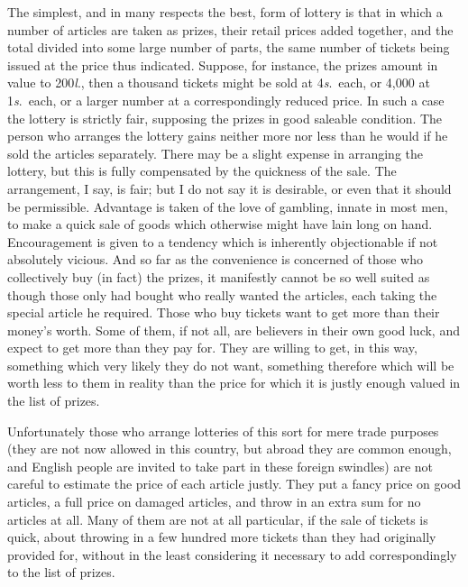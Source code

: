 \documentclass[letterpaper,12pt,oneside,openany]{memoir}
\begin{document}
The simplest, and in many respects the best, form
of lottery is that in which a number of articles are
taken as prizes, their retail prices added together, and
the total divided into some large number of parts, the
same number of tickets being issued at the price thus
indicated. Suppose, for instance, the prizes amount in
value to 200\textit{l}., then a thousand tickets might be sold at
4\textit{s}.~each, or 4,000 at 1\textit{s}.~each, or a larger number at a
correspondingly reduced price. In such a case the
lottery is strictly fair, supposing the prizes in good
saleable condition. The person who arranges the lottery
gains neither more nor less than he would if he sold
the articles separately. There may be a slight expense
in arranging the lottery, but this is fully compensated
by the quickness of the sale. The arrangement, I say,
is fair; but I do not say it is desirable, or even that it
should be permissible. Advantage is taken of the love
of gambling, innate in most men, to make a quick sale
of goods which otherwise might have lain long on hand.
Encouragement is given to a tendency which is inherently
objectionable if not absolutely vicious. And
so far as the convenience is concerned of those who collectively
buy (in fact) the prizes, it manifestly cannot
be so well suited as though those only had bought who
really wanted the articles, each taking the special article
he required. Those who buy tickets want to get
more than their money's worth. Some of them, if not
all, are believers in their own good luck, and expect to
get more than they pay for. They are willing to get,
in this way, something which very likely they do not
want, something therefore which will be worth less to
them in reality than the price for which it is justly
enough valued in the list of prizes.

Unfortunately those who arrange lotteries of this
sort for mere trade purposes (they are not now allowed
in this country, but abroad they are common enough,
and English people are invited to take part in these
foreign swindles) are not careful to estimate the price
of each article justly. They put a fancy price on good
articles, a full price on damaged articles, and throw in
an extra sum for no articles at all. Many of them are
not at all particular, if the sale of tickets is quick, about
throwing in a few hundred more tickets than they had
originally provided for, without in the least considering
it necessary to add correspondingly to the list of prizes.
\end{document}
